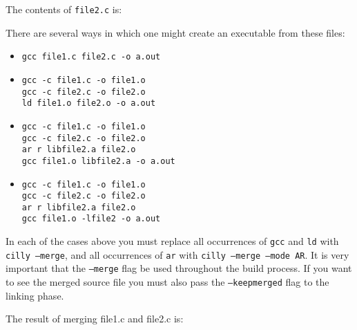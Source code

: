 \documentclass{article}
\def\t#1{{\tt #1}}
\begin{document}
 The contents of \t{file2.c} is:


 There are several ways in which one might create an executable from these
files:
\begin{itemize}
\item
\begin{verbatim}
gcc file1.c file2.c -o a.out
\end{verbatim}

\item 
\begin{verbatim}
gcc -c file1.c -o file1.o
gcc -c file2.c -o file2.o
ld file1.o file2.o -o a.out
\end{verbatim}

\item 
\begin{verbatim}
gcc -c file1.c -o file1.o
gcc -c file2.c -o file2.o
ar r libfile2.a file2.o
gcc file1.o libfile2.a -o a.out
\end{verbatim}

\item 
\begin{verbatim}
gcc -c file1.c -o file1.o
gcc -c file2.c -o file2.o
ar r libfile2.a file2.o
gcc file1.o -lfile2 -o a.out
\end{verbatim}
\end{itemize}

 In each of the cases above you must replace all occurrences of \t{gcc} and
\t{ld} with \t{cilly --merge}, and all occurrences of \t{ar} with \t{cilly
--merge --mode AR}. It is very important that the \t{--merge} flag be used
throughout the build process. If you want to see the merged source file you
must also pass the \t{--keepmerged} flag to the linking phase. 

 The result of merging file1.c and file2.c is:
\end{document}
